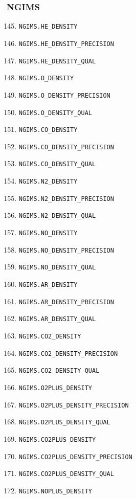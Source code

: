 \documentclass{article}
\begin{document}
\subsubsection{NGIMS}
\begin{enumerate}
\setcounter{enumi}{144}
    \item \texttt{NGIMS.HE\_DENSITY}
    \item \texttt{NGIMS.HE\_DENSITY\_PRECISION}
    \item \texttt{NGIMS.HE\_DENSITY\_QUAL}
    \item \texttt{NGIMS.O\_DENSITY}
    \item \texttt{NGIMS.O\_DENSITY\_PRECISION}
    \item \texttt{NGIMS.O\_DENSITY\_QUAL}
    \item \texttt{NGIMS.CO\_DENSITY}
    \item \texttt{NGIMS.CO\_DENSITY\_PRECISION}
    \item \texttt{NGIMS.CO\_DENSITY\_QUAL}
    \item \texttt{NGIMS.N2\_DENSITY}
    \item \texttt{NGIMS.N2\_DENSITY\_PRECISION}
    \item \texttt{NGIMS.N2\_DENSITY\_QUAL}
    \item \texttt{NGIMS.NO\_DENSITY}
    \item \texttt{NGIMS.NO\_DENSITY\_PRECISION}
    \item \texttt{NGIMS.NO\_DENSITY\_QUAL}
    \item \texttt{NGIMS.AR\_DENSITY}
    \item \texttt{NGIMS.AR\_DENSITY\_PRECISION}
    \item \texttt{NGIMS.AR\_DENSITY\_QUAL}
    \item \texttt{NGIMS.CO2\_DENSITY}
    \item \texttt{NGIMS.CO2\_DENSITY\_PRECISION}
    \item \texttt{NGIMS.CO2\_DENSITY\_QUAL}
    \item \texttt{NGIMS.O2PLUS\_DENSITY}
    \item \texttt{NGIMS.O2PLUS\_DENSITY\_PRECISION}
    \item \texttt{NGIMS.O2PLUS\_DENSITY\_QUAL}
    \item \texttt{NGIMS.CO2PLUS\_DENSITY}
    \item \texttt{NGIMS.CO2PLUS\_DENSITY\_PRECISION}
    \item \texttt{NGIMS.CO2PLUS\_DENSITY\_QUAL}
    \item \texttt{NGIMS.NOPLUS\_DENSITY}

\end{enumerate}
\end{document}
